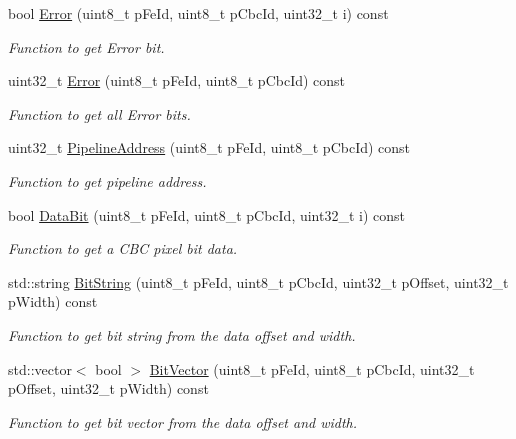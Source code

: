 \begin{CompactItemize}
bool \hyperlink{class_ph2___hw_interface_1_1_event_e0242a4b78e3da2959a2bcfb8adb86f9}{Error} (uint8\_\-t p\-Fe\-Id, uint8\_\-t p\-Cbc\-Id, uint32\_\-t i) const 
\begin{CompactList}\small\item\em Function to get Error bit. \item\end{CompactList}\item 
uint32\_\-t \hyperlink{class_ph2___hw_interface_1_1_event_b3bbc58be7f96ba0dbc1721eb90d4380}{Error} (uint8\_\-t p\-Fe\-Id, uint8\_\-t p\-Cbc\-Id) const 
\begin{CompactList}\small\item\em Function to get all Error bits. \item\end{CompactList}\item 
uint32\_\-t \hyperlink{class_ph2___hw_interface_1_1_event_2597189e1c09b65433df4489f5afbf56}{Pipeline\-Address} (uint8\_\-t p\-Fe\-Id, uint8\_\-t p\-Cbc\-Id) const 
\begin{CompactList}\small\item\em Function to get pipeline address. \item\end{CompactList}\item 
bool \hyperlink{class_ph2___hw_interface_1_1_event_3e93e6f16944f443caffd2df81262fbe}{Data\-Bit} (uint8\_\-t p\-Fe\-Id, uint8\_\-t p\-Cbc\-Id, uint32\_\-t i) const 
\begin{CompactList}\small\item\em Function to get a CBC pixel bit data. \item\end{CompactList}\item 
std::string \hyperlink{class_ph2___hw_interface_1_1_event_67261ba2ea976e1c265c8aa7fe1a4b2d}{Bit\-String} (uint8\_\-t p\-Fe\-Id, uint8\_\-t p\-Cbc\-Id, uint32\_\-t p\-Offset, uint32\_\-t p\-Width) const 
\begin{CompactList}\small\item\em Function to get bit string from the data offset and width. \item\end{CompactList}\item 
std::vector$<$ bool $>$ \hyperlink{class_ph2___hw_interface_1_1_event_b83e11f21873bd5beebd1049671ce3da}{Bit\-Vector} (uint8\_\-t p\-Fe\-Id, uint8\_\-t p\-Cbc\-Id, uint32\_\-t p\-Offset, uint32\_\-t p\-Width) const 
\begin{CompactList}\small\item\em Function to get bit vector from the data offset and width. \item\end{CompactList}\item 

\end{CompactItemize}
